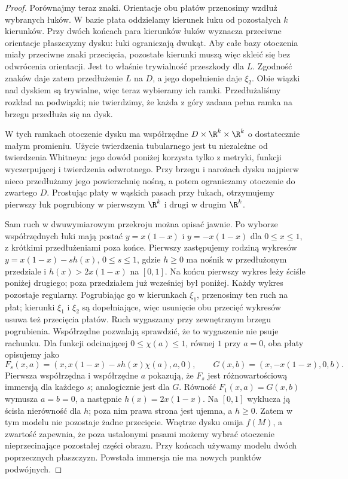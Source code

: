 \begin{proof}
Porównajmy teraz znaki. Orientacje obu płatów
przenosimy wzdłuż wybranych łuków. W bazie płata
oddzielamy kierunek łuku od pozostałych $k$ kierunków.
Przy dwóch końcach para kierunków łuków wyznacza
przeciwne orientacje płaszczyzny dysku: łuki
ograniczają dwukąt. Aby całe bazy otoczenia miały
przeciwne znaki przecięcia, pozostałe kierunki
muszą więc skleić się bez odwrócenia orientacji.
Jest to właśnie trywialność przeszkody dla $L$.
Zgodność znaków daje zatem przedłużenie $L$ na $D$,
a jego dopełnienie daje $\xi_2$. Obie wiązki nad
dyskiem są trywialne, więc teraz wybieramy ich ramki.
Przedłużaliśmy rozkład na podwiązki; nie twierdzimy,
że każda z góry zadana pełna ramka na brzegu
przedłuża się na dysk.

W tych ramkach otoczenie dysku ma współrzędne
$D\times\R^k\times\R^k$ o dostatecznie małym promieniu.
Użycie twierdzenia tubularnego jest tu niezależne
od twierdzenia Whitneya: jego dowód poniżej korzysta
tylko z metryki, funkcji wyczerpującej i twierdzenia
odwrotnego. Przy brzegu i narożach dysku najpierw
nieco przedłużamy jego powierzchnię nośną, a potem
ograniczamy otoczenie do zwartego $D$.
Prostując płaty w wąskich pasach przy łukach,
otrzymujemy pierwszy łuk pogrubiony w pierwszym
$\R^k$ i drugi w drugim $\R^k$.

Sam ruch w dwuwymiarowym przekroju można opisać
jawnie. Po wyborze współrzędnych łuki mają postać
$y=x(1-x)$ i $y=-x(1-x)$ dla $0\leq x\leq1$,
z krótkimi przedłużeniami poza końce. Pierwszy
zastępujemy rodziną wykresów
$y=x(1-x)-s h(x)$, $0\leq s\leq1$, gdzie $h\geq0$
ma nośnik w przedłużonym przedziale i
$h(x)>2x(1-x)$ na $[0,1]$.
Na końcu pierwszy wykres leży ściśle poniżej
drugiego; poza przedziałem już wcześniej był poniżej.
Każdy wykres pozostaje regularny. Pogrubiając go
w kierunkach $\xi_1$, przenosimy ten ruch na płat;
kierunki $\xi_1$ i $\xi_2$ są dopełniające, więc
usunięcie obu przecięć wykresów usuwa też przecięcia
płatów. Ruch wygaszamy przy zewnętrznym brzegu
pogrubienia.
Współrzędne pozwalają sprawdzić, że to wygaszenie
nie psuje rachunku. Dla funkcji odcinającej
$0\leq\chi(a)\leq1$, równej $1$ przy $a=0$,
oba płaty opisujemy jako
\[
 F_s(x,a)=(x,x(1-x)-s h(x)\chi(a),a,0),\qquad
 G(x,b)=(x,-x(1-x),0,b).
\]
Pierwsza współrzędna i współrzędne $a$ pokazują,
że $F_s$ jest różnowartościową immersją dla każdego $s$;
analogicznie jest dla $G$.
Równość $F_1(x,a)=G(x,b)$ wymusza $a=b=0$,
a następnie $h(x)=2x(1-x)$.
Na $[0,1]$ wyklucza ją ścisła nierówność dla $h$;
poza nim prawa strona jest ujemna, a $h\geq0$.
Zatem w tym modelu nie pozostaje żadne przecięcie.
Wnętrze dysku omija $f(M)$, a zwartość
zapewnia, że poza ustalonymi pasami możemy wybrać
otoczenie nieprzecinające pozostałej części obrazu.
Przy końcach używamy modelu dwóch poprzecznych
płaszczyzn. Powstała immersja nie ma nowych
punktów podwójnych.
\end{proof}

